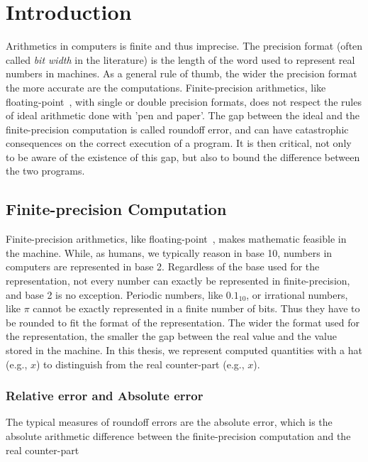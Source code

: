 
\chapter{Introduction}

\setupuuchapterbib

Arithmetics in computers is finite and thus imprecise.
%
The precision format (often called \emph{bit width} in the literature) is the length of the word used to represent real numbers in machines.
%
As a general rule of thumb, the wider the precision format the more accurate are the computations.
%
Finite-precision arithmetics, like floating-point~\cite{ieee754}, with single or double precision formats, does not respect the rules of ideal arithmetic done with 'pen and paper'. 
%
The gap between the ideal and the finite-precision computation is called roundoff error, and can have catastrophic consequences on the correct execution of a program.
%
It is then critical, not only to be aware of the existence of this gap, but also to bound the difference between the two programs.
%
\section{Finite-precision Computation}
%
Finite-precision arithmetics, like floating-point~\cite{}, makes mathematic feasible in the machine. 
%
While, as humans, we typically reason in base 10, numbers in computers are represented in base 2.
%
Regardless of the base used for the representation, not every number can exactly be represented in finite-precision, and base 2 is no exception.
%
Periodic numbers, like $0.1_{10}$, or irrational numbers, like $\pi$ cannot be exactly represented in a finite number of bits.
%
Thus they have to be rounded to fit the format of the representation. 
%
The wider the format used for the representation, the smaller the gap between the real value and the value stored in the machine.
%
In this thesis, we represent computed quantities with a hat (e.g., $\widehat{x}$) to distinguish from the real counter-part (e.g., $x$).
\subsection{Relative error and Absolute error}
%
The typical measures of roundoff errors are the absolute error, which is the absolute arithmetic difference between the finite-precision computation and the real counter-part
%

